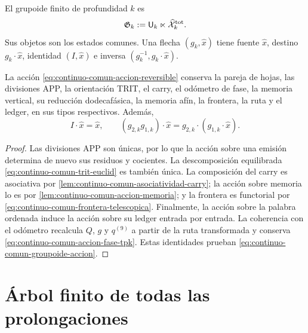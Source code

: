 \begin{definition}
\label{def:continuo-comun-groupoide}
El grupoide finito de profundidad \(k\) es
\begin{equation}
\label{eq:continuo-comun-groupoide}
 \mathfrak G_k
 :=\mathsf U_k\ltimes\widehat{\mathcal X}^{\rm tot}_k.
\end{equation}
Sus objetos son los estados comunes.  Una flecha
\((g_k,\widehat x)\) tiene fuente \(\widehat x\), destino
\(g_k\cdot\widehat x\), identidad \((I,\widehat x)\) e inversa
\((g_k^{-1},g_k\cdot\widehat x)\).
\end{definition}

\begin{lemma}
\label{lem:continuo-comun-groupoide-conserva}
La acción \eqref{eq:continuo-comun-accion-reversible} conserva la pareja de
hojas, las divisiones APP, la orientación TRIT, el carry, el odómetro de
fase, la memoria vertical, su reducción dodecafásica, la memoria afín, la
frontera, la ruta y el ledger, en sus tipos respectivos.  Además,
\begin{equation}
\label{eq:continuo-comun-groupoide-accion}
 I\cdot\widehat x=\widehat x,
 \qquad
 (g_{2,k}g_{1,k})\cdot\widehat x
 =g_{2,k}\cdot(g_{1,k}\cdot\widehat x).
\end{equation}
\end{lemma}

\begin{proof}
Las divisiones APP son únicas, por lo que la acción sobre una emisión
determina de nuevo sus residuos y cocientes.  La descomposición equilibrada
\eqref{eq:continuo-comun-trit-euclid} es también única.  La composición del
carry es asociativa por
\cref{lem:continuo-comun-asociatividad-carry}; la acción sobre memoria lo es
por \cref{lem:continuo-comun-accion-memoria}; y la frontera es functorial por
\eqref{eq:continuo-comun-frontera-telescopica}.  Finalmente, la acción sobre
la palabra ordenada induce la acción sobre su ledger entrada por entrada.
La coherencia con el odómetro recalcula \(Q\), \(g\) y \(q^{(9)}\) a partir
de la ruta transformada y conserva
\eqref{eq:continuo-comun-accion-fase-tpk}. Estas identidades prueban
\eqref{eq:continuo-comun-groupoide-accion}.
\end{proof}

\section{Árbol finito de todas las prolongaciones}
\label{sec:continuo-comun-arbol}

